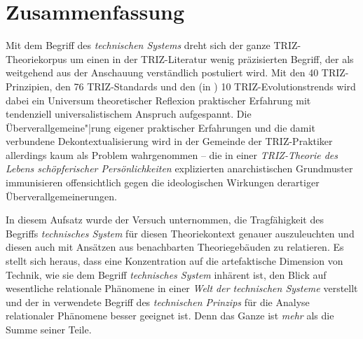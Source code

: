 \documentclass[11pt,a4paper]{article}
\begin{document}
\section{Zusammenfassung}

Mit dem Begriff des \emph{technischen Systems} dreht sich der ganze
TRIZ-Theoriekorpus um einen in der TRIZ-Literatur wenig präzisierten Begriff,
der als weitgehend aus der Anschauung verständlich postuliert wird. Mit den 40
TRIZ-Prinzipien, den 76 TRIZ-Standards und den (in \cite{TESE2018}) 10
TRIZ-Evolutionstrends wird dabei ein Universum theoretischer Reflexion
praktischer Erfahrung mit tendenziell universalistischem Anspruch aufgespannt.
Die Überverallgemeine"|rung eigener praktischer Erfahrungen und die damit
verbundene Dekontextualisierung wird in der Gemeinde der TRIZ-Praktiker
allerdings kaum als Problem wahrgenommen -- die in einer \emph{TRIZ-Theorie
  des Lebens schöpferischer Persönlichkeiten} explizierten anarchistischen
Grundmuster immunisieren offensichtlich gegen die ideologischen Wirkungen
derartiger Überverallgemeinerungen.

In diesem Aufsatz wurde der Versuch unternommen, die Tragfähigkeit des
Begriffs \emph{technisches System} für diesen Theoriekontext genauer
auszuleuchten und diesen auch mit Ansätzen aus benachbarten Theoriegebäuden zu
relatieren.  Es stellt sich heraus, dass eine Konzentration auf die
artefaktische Dimension von Technik, wie sie dem Begriff  \emph{technisches
  System} inhärent ist, den Blick auf wesentliche relationale Phänomene in
einer \emph{Welt der technischen Systeme} verstellt und der in
\cite{Shpakovsky2010} verwendete Begriff des \emph{technischen Prinzips} für
die Analyse relationaler Phänomene besser geeignet ist. Denn das Ganze ist
\emph{mehr} als die Summe seiner Teile.
\end{document}
